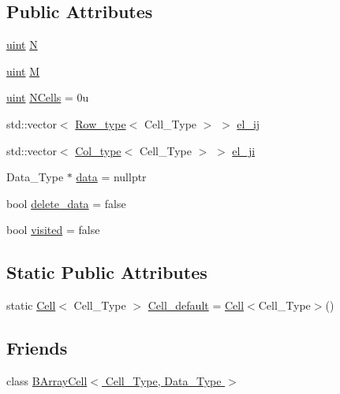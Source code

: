 \subsection*{Public Attributes}
\begin{DoxyCompactItemize}
\item 
\hyperlink{typedefs_8hpp_a91ad9478d81a7aaf2593e8d9c3d06a14}{uint} \hyperlink{class_b_array_a4b34ec8636c989efe80bbe3f1cea217e}{N}
\item 
\hyperlink{typedefs_8hpp_a91ad9478d81a7aaf2593e8d9c3d06a14}{uint} \hyperlink{class_b_array_a197359753fd1bc054a1a14f7641d3fd1}{M}
\item 
\hyperlink{typedefs_8hpp_a91ad9478d81a7aaf2593e8d9c3d06a14}{uint} \hyperlink{class_b_array_a31fd64c6b54408ca98e07abc9c4241c5}{N\+Cells} = 0u
\item 
std\+::vector$<$ \hyperlink{typedefs_8hpp_a4deca4f3fb25a4da374818ab459b8b4a}{Row\+\_\+type}$<$ Cell\+\_\+\+Type $>$ $>$ \hyperlink{class_b_array_a2161dc7c2046a57d3e663ac5c0d70431}{el\+\_\+ij}
\item 
std\+::vector$<$ \hyperlink{typedefs_8hpp_a3bb95a7612ee928fba42f33a96adb3eb}{Col\+\_\+type}$<$ Cell\+\_\+\+Type $>$ $>$ \hyperlink{class_b_array_aad8ce1aa5fddd3899164c1aa1dfede94}{el\+\_\+ji}
\item 
Data\+\_\+\+Type $\ast$ \hyperlink{class_b_array_a9576163b52124021575e50dbcca2f6b9}{data} = nullptr
\item 
bool \hyperlink{class_b_array_a1e932e3353905d77a2062560ee96b2fc}{delete\+\_\+data} = false
\item 
bool \hyperlink{class_b_array_ae0860bf21425397d1498f94da6518e85}{visited} = false
\end{DoxyCompactItemize}
\subsection*{Static Public Attributes}
\begin{DoxyCompactItemize}
\item 
static \hyperlink{class_cell}{Cell}$<$ Cell\+\_\+\+Type $>$ \hyperlink{class_b_array_a5700cd9bb3814f84c62dda0ea47931bc}{Cell\+\_\+default} = \hyperlink{class_cell}{Cell}$<$Cell\+\_\+\+Type$>$()
\end{DoxyCompactItemize}
\subsection*{Friends}
\begin{DoxyCompactItemize}
\item 
class \hyperlink{class_b_array_a2cd2ece8a4fc1027d3151b1ec33151cb}{B\+Array\+Cell$<$ Cell\+\_\+\+Type, Data\+\_\+\+Type $>$}
\end{DoxyCompactItemize}


